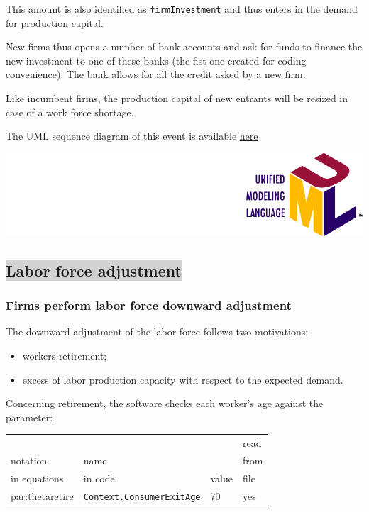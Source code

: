 \documentclass{book}
\newcommand{\doclocation}{file:///Users/giulioni/Documents/workspace/gabriele/docs}
\begin{document}
\vskip3mm
This amount is also identified as \verb+firmInvestment+ and thus enters in the demand for production capital.

New firms thus opens a number of bank accounts and ask for funds to finance the new investment to one of these banks (the fist one created for coding convenience).
The bank allows for all the credit asked by a new firm.

Like incumbent firms, the production capital of new entrants will be resized in case of a work force shortage.

\vskip3mm
The UML sequence diagram of this event is available \href{\doclocation/umldoc/performFirmsEntry.html}{here}
\begin{marginfigure}
	\includegraphics[scale=0.1]{uml.png}
\end{marginfigure}



\subsection*{\colorbox{lightgray}{Labor force adjustment}}

\subsubsection{Firms perform labor force downward adjustment}

The downward adjustment of the labor force follows two motivations:
\begin{itemize}
	\item workers retirement;
	\item excess of labor production capacity with respect to the expected demand.
\end{itemize}

Concerning retirement, the software checks each worker's age against the parameter:\\

\vskip2mm
\noindent
\begin{tabular}{l l l l}
	\hline
	& &&read\\
	notation& name &&from\\
	in equations& in code&value&file\\
	\hline
	\hline
	\gls{par:thetaretire}&\verb+Context.ConsumerExitAge+&70&yes\\
	\hline
\end{tabular}
\end{document}
